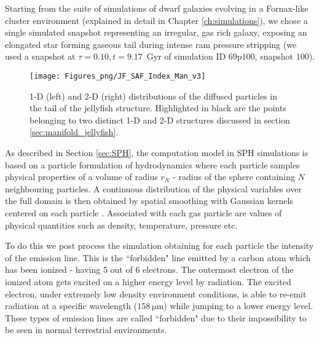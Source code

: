 Starting from the suite of simulations of dwarf galaxies evolving in a Fornax-like cluster environment (explained in detail in Chapter \ref{ch:simulations}), we chose a single simulated snapshot representing an irregular, gas rich galaxy, exposing an elongated star forming gaseous tail during intense ram pressure stripping (we used a snapshot at $\tau=0.10, t=9.17$~Gyr of simulation ID $69$p$100$, snapshot 100). %
\begin{figure}[ht]
    \centering
    \texttt{[image: Figures\_png/JF\_SAF\_Index\_Man\_v3]}
    \caption{1-D (left) and 2-D (right) distributions of the diffused particles in the tail of the jellyfish structure.
    Highlighted in black are the points belonging to two distinct 1-D and 2-D structures discussed in section \ref{sec:manifold_jellyfish}.}
    \label{fig:JF_Res}
\end{figure}
As described in Section \ref{sec:SPH}, the computation model in SPH simulations is based on a particle formulation of hydrodynamics where each particle samples physical properties of a volume of radius $r_N$ - radius of the sphere containing $N$ neighbouring particles.
A continuous distribution of the physical variables over the full domain is then obtained by spatial smoothing with Gaussian kernels centered on each particle \citep{1977MNRAS.181..375G}. %
Associated with each gas particle are values of physical quantities such as density, temperature, pressure etc.

To do this we post process the simulation obtaining for each particle the intensity of the \cii{} emission line.
This is the ``forbidden" line emitted by a carbon atom which has been ionized - having 5 out of 6 electrons.
The outermost electron of the ionized atom gets excited on a higher energy level by radiation.
The excited electron, under extremely low density environment conditions, is able to re-emit radiation at a specific wavelength ($158 ~ \mathrm{\mu m}$) while jumping to a lower energy level.
These types of emission lines are called ``forbidden" due to their impossibility to be seen in normal terrestrial environments.


